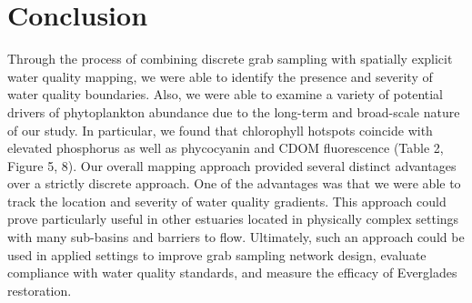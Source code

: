 \section{Conclusion}
\label{conclusion}

	Through the process of combining discrete grab sampling with spatially explicit water quality mapping, we were able to identify the presence and severity of water quality boundaries. Also, we were able to examine a variety of potential drivers of phytoplankton abundance due to the long-term and broad-scale nature of our study. In particular, we found that chlorophyll hotspots coincide with elevated phosphorus as well as phycocyanin and CDOM fluorescence (Table 2, Figure 5, 8). Our overall mapping approach provided several distinct advantages over a strictly discrete approach. One of the advantages was that we were able to track the location and severity of water quality gradients. This approach could prove particularly useful in other estuaries located in physically complex settings with many sub-basins and barriers to flow.	Ultimately, such an approach could be used in applied settings to improve grab sampling network design, evaluate compliance with water quality standards, and measure the efficacy of Everglades restoration.


%

%




%
%


